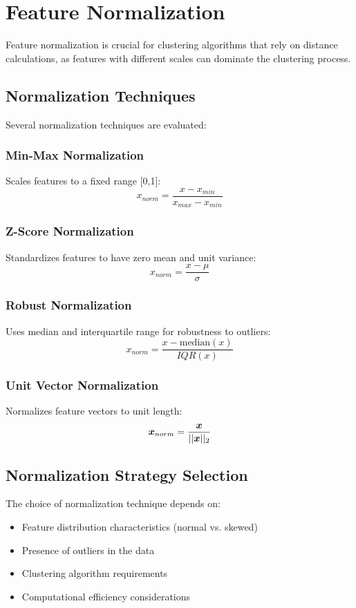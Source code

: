 \section{Feature Normalization}
Feature normalization is crucial for clustering algorithms that rely on distance calculations, as features with different scales can dominate the clustering process.

\subsection{Normalization Techniques}
Several normalization techniques are evaluated:

\subsubsection{Min-Max Normalization}
Scales features to a fixed range [0,1]:
\begin{equation}
x_{norm} = \frac{x - x_{min}}{x_{max} - x_{min}}
\end{equation}

\subsubsection{Z-Score Normalization}
Standardizes features to have zero mean and unit variance:
\begin{equation}
x_{norm} = \frac{x - \mu}{\sigma}
\end{equation}

\subsubsection{Robust Normalization}
Uses median and interquartile range for robustness to outliers:
\begin{equation}
x_{norm} = \frac{x - \text{median}(x)}{IQR(x)}
\end{equation}

\subsubsection{Unit Vector Normalization}
Normalizes feature vectors to unit length:
\begin{equation}
\boldsymbol{x}_{norm} = \frac{\boldsymbol{x}}{||\boldsymbol{x}||_2}
\end{equation}

\subsection{Normalization Strategy Selection}
The choice of normalization technique depends on:
\begin{itemize}
\item Feature distribution characteristics (normal vs. skewed)
\item Presence of outliers in the data
\item Clustering algorithm requirements
\item Computational efficiency considerations
\end{itemize}

